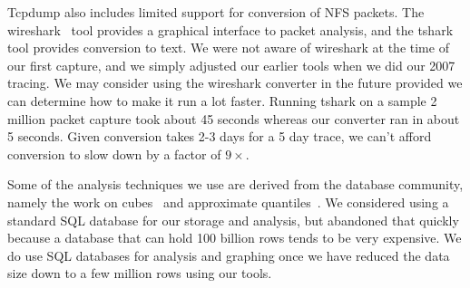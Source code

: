 
Tcpdump also includes limited support for conversion of NFS packets.
The wireshark~\cite{wireshark} tool provides a graphical interface to
packet analysis, and the tshark tool provides conversion to text.  We
were not aware of wireshark at the time of our first capture, and we
simply adjusted our earlier tools when we did our 2007 tracing.  We
may consider using the wireshark converter in the future provided we
can determine how to make it run a lot faster.  Running tshark on a
sample 2 million packet capture took about 45 seconds whereas our
converter ran in about 5 seconds.  Given conversion takes 2-3 days for
a 5 day trace, we can't afford conversion to slow down by a factor of
$9\times$.

Some of the analysis techniques we use are derived from the database
community, namely the work on cubes~\cite{gray97cube} and approximate
quantiles~\cite{Manku98approximatemedians}.  We considered using a
standard SQL database for our storage and analysis, but abandoned that
quickly because a database that can hold 100 billion rows tends to be
very expensive.  We do use SQL databases for analysis and graphing
once we have reduced the data size down to a few million rows using
our tools.




